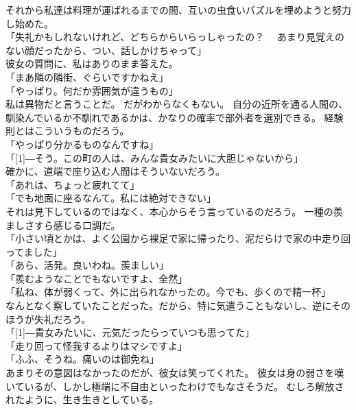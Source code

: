 \documentclass[../HiganMain]{subfiles}
\begin{document}
それから私達は料理が運ばれるまでの間、互いの虫食いパズルを埋めようと努力し始めた。\\

「失礼かもしれないけれど、どちらからいらっしゃったの？　
あまり見覚えのない顔だったから、つい、話しかけちゃって」\\
彼女の質問に、私はありのまま答えた。\\
「まあ隣の隣街、ぐらいですかねえ」\\
「やっぱり。何だか雰囲気が違うもの」\\
私は異物だと言うことだ。
だがわからなくもない。
自分の近所を通る人間の、馴染んでいるか不馴れであるかは、かなりの確率で部外者を選別できる。
経験則とはこういうものだろう。\\
「やっぱり分かるものなんですね」\\
「\scalebox{3}[1]{―}そう。この町の人は、みんな貴女みたいに大胆じゃないから」\\
確かに、道端で座り込む人間はそういないだろう。\\
「あれは、ちょっと疲れてて」\\
「でも地面に座るなんて。私には絶対できない」\\
それは見下しているのではなく、本心からそう言っているのだろう。
一種の羨ましさすら感じる口調だ。\\
「小さい頃とかは、よく公園から裸足で家に帰ったり、泥だらけで家の中走り回ってました」\\
「あら、活発。良いわね。羨ましい」\\
「羨むようなことでもないですよ、全然」\\
「私ね、体が弱くって、外に出られなかったの。今でも、歩くので精一杯」\\
なんとなく察していたことだった。だから、特に気遣うこともないし、逆にそのほうが失礼だろう。\\
「\scalebox{3}[1]{―}貴女みたいに、元気だったらっていつも思ってた」\\
「走り回って怪我するよりはマシですよ」\\
「ふふ、そうね。痛いのは御免ね」\\
あまりその意図はなかったのだが、彼女は笑ってくれた。
彼女は身の弱さを嘆いているが、しかし極端に不自由といったわけでもなさそうだ。
むしろ解放されたように、生き生きとしている。\\
\end{document}
